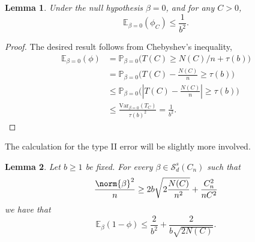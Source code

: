 \documentclass{article}
\newcommand{\abs}[1]{\left \lvert #1 \right \rvert}
\newcommand{\Var}{\mathrm{Var}}
\newcommand{\1}{\mathbf{1}}
\newcommand{\Pbb}{\mathbb{P}}
\newcommand{\Ebb}{\mathbb{E}}
\theoremstyle{alden}
\theoremstyle{aldenthm}
\newtheorem{lemma}{Lemma}
\theoremstyle{definition}
\theoremstyle{remark}
\begin{document}
\begin{lemma}
	\label{lem:type_I_error}
	Under the null hypothesis $\beta = 0$, and for any $C > 0$,
	\begin{equation*}
	\Ebb_{\beta = 0}(\phi_C) \leq \frac{1}{b^2}. 
	\end{equation*}
\end{lemma}
\begin{proof}
	The desired result follows from Chebyshev's inequality,
	\begin{align*}
	\Ebb_{\beta = 0}(\phi) & = \Pbb_{\beta = 0}\bigl(T(C) \geq N(C)/n + \tau(b)\bigr) \\ 
	& = \Pbb_{\beta = 0}\bigl(T(C) - \frac{N(C)}{n} \geq \tau(b)\bigr) \\
	& \leq \Pbb_{\beta = 0}\bigl(\abs{T(C) - \frac{N(C)}{n}} \geq \tau(b)\bigr) \\
	& \leq \frac{\Var_{\beta = 0}(T_C)}{\tau(b)^2} = \frac{1}{b^2}.
	\end{align*}
\end{proof}
The calculation for the type II error will be slightly more involved.
\begin{lemma}
	\label{lem:type_II}
	Let $b \geq 1$ be fixed. For every $\beta \in \mathcal{S}_d^s(C_n)$ such that
	\begin{equation}
	\label{eqn:type_II}
	\frac{\norm{\beta}^2}{n} \geq 2b\sqrt{2\frac{N(C)}{n^2}} + \frac{C_n^2}{nC^2}
	\end{equation}
	we have that
	\begin{equation*}
	\Ebb_{\beta}(1 - \phi) \leq \frac{2}{b^2} + \frac{2}{b\sqrt{2N(C)}}.
	\end{equation*}
\end{lemma}
\end{document}

